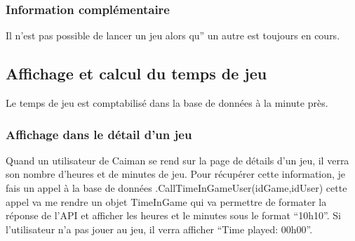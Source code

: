 \documentclass[a4paper,12pt,french]{sphinxmanual}
\begin{document}
\subsubsection{Information complémentaire}
\label{\detokenize{organique:information-complementaire}}
\sphinxAtStartPar
Il n’est pas possible de lancer un jeu alors qu” un autre est toujours en cours.


\subsection{Affichage et calcul du temps de jeu}
\label{\detokenize{organique:affichage-et-calcul-du-temps-de-jeu}}
\sphinxAtStartPar
Le temps de jeu est comptabilisé dans la base de données à la minute près.


\subsubsection{Affichage dans le détail d’un jeu}
\label{\detokenize{organique:affichage-dans-le-detail-dun-jeu}}
\sphinxAtStartPar
Quand un utilisateur de Caiman se rend sur la page de détails d’un jeu, il verra son nombre d’heures et de minutes de jeu. Pour récupérer cette information, je fais un appel à la base de données .CallTimeInGameUser(idGame,idUser) cette appel va me rendre un objet TimeInGame qui va permettre de formater la réponse de l’API et afficher les heures et le minutes sous le format “10h10”. Si l’utilisateur n’a pas jouer au jeu, il verra afficher “Time played: 00h00”.
\end{document}
